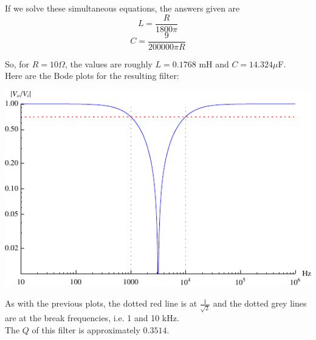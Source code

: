 \documentclass[12pt,a4paper]{report}
\begin{document}
If we solve these simultaneous equations, the answers given are
\[ L = \frac{R}{1800\pi} \]
\[ C = \frac{9}{200000\pi R} \]

So, for $R = 10 \Omega$, the values are roughly $L = 0.1768$ mH and $C = 14.324\mu$F.\\

Here are the Bode plots for the resulting filter:

\includegraphics[scale=1.4]{Graphics/bsf_magnitude_plot}

As with the previous plots, the dotted red line is at $\displaystyle \frac{1}{\sqrt{2}}$ and the dotted grey lines are at the break frequencies, i.e. 1 and 10 kHz.\\
The $Q$ of this filter is approximately $0.3514$.

\begin{comment}
f[x_] = If[x < -\[Pi]/2, x + \[Pi], x]

LogLinearPlot[{f[-ArcTan[
      1 - (\[Omega]*2*Pi)^2 L c, (\[Omega]*2*Pi) R c]]*180/Pi, -45, 
  45}, {\[Omega], 10, 10^6}, 
 PlotStyle -> {Blue, {Red, Dotted}, {Red, Dotted}}, 
 AxesLabel -> {Hz, "Degrees"}, GridLines -> {{10^3, 10^4}, None}, 
 GridLinesStyle -> Dotted, PlotRange -> Full, 
 Ticks -> {Automatic, Union[{-45, 45}, Range[90, -90, -10]]}]
\end{comment}
\end{document}

